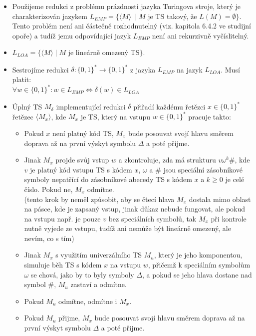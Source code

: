 \documentclass[a4paper,11pt]{article}[24.3.2010]
\begin{document}
\begin{enumerate}
\begin{itemize}
\item Použijeme redukci z problému prázdnosti jazyka Turingova stroje, který je charakterizován jazykem $L_{EMP} = \{\langle M\rangle\ \mid M$ je TS takový, že $L(M) = \emptyset\}$. Tento problém není ani částečně rozhodnutelný (viz. kapitola 6.4.2 ve studijní opoře) a tudíž jemu odpovídající jazyk $L_{EMP}$ není ani rekurzivně vyčíslitelný.
\item $L_{LOA} = \{\langle M\rangle \mid M$ je lineárně omezený TS$\}$.
\item Sestrojíme redukci $\delta : \{0,1\}^* \rightarrow \{0,1\}^*$ z jazyka $L_{EMP}$  na jazyk $L_{LOA}$. Musí platit:\\
$\forall w \in \{0,1\}^* : w \in L_{EMP} \Leftrightarrow \delta(w) \in L_{LOA}$
\item Úplný TS $M_{\delta}$ implementující redukci $\delta$ přiřadí každému řetězci $x \in \{0,1\}^*$ řetězec $\langle M_{x}\rangle$, kde $M_{x}$ je TS, který na vstupu $w \in \{0,1\}^*$ pracuje takto:
\begin{itemize}
\item Pokud $x$ není platný kód TS, $M_{x}$ bude posouvat svojí hlavu směrem doprava až na první výskyt symbolu $\Delta$ a poté přijme.
\item Jinak $M_{x}$ projde svůj vstup $w$ a zkontroluje, zda má strukturu $v\omega^k\#$, kde $v$ je platný kód vstupu TS s kódem $x$, $\omega$ a $\#$ jsou speciální zásobníkové symboly nepatřící do zásobníkové abecedy TS s kódem $x$ a $k\geq 0$ je celé číslo. Pokud ne, $M_{x}$ odmítne.\\
(tento krok by neměl způsobit, aby se čtecí hlava $M_{x}$ dostala mimo oblast na pásce, kde je zapsaný vstup, jinak důkaz nebude fungovat, ale pokud na vstupu např. je pouze $v$ bez speciálních symbolů, tak $M_{x}$ při kontrole nutně vyjede ze vstupu, tudíž ani nemůže být lineárně omezený, ale nevím, co s tím)
\item Jinak $M_{x}$ s využitím univerzálního TS $M_{u}$, který je jeho komponentou, simuluje běh TS s kódem $x$ na vstupu $w$, přičemž k speciálním symbolům $\omega$ se chová, jako by to byly symboly $\Delta$, a pokud se jeho hlava dostane nad symbol $\#$, $M_{u}$ zastaví a odmítne.
\item Pokud $M_{u}$ odmítne, odmítne i $M_{x}$.
\item Pokud $M_{u}$ přijme, $M_{x}$ bude posouvat svojí hlavu směrem doprava až na první výskyt symbolu $\Delta$ a poté přijme.
\end{itemize}

\end{itemize}
\end{enumerate}
\end{document}
